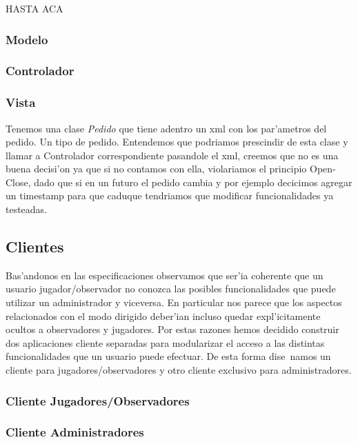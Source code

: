 \todo HASTA ACA

\subsubsection{Modelo}

\subsubsection{Controlador}

\subsubsection{Vista}

Tenemos una clase \textit{Pedido} que tiene adentro un xml con los par'ametros del pedido. Un tipo de pedido.
Entendemos que podriamos prescindir de esta clase y llamar a Controlador correspondiente pasandole el xml,
creemos que no es una buena decisi'on ya que si no contamos con ella, violariamos el principio Open-Close, dado 
que si en un futuro el pedido cambia y por ejemplo decicimos agregar un timestamp para que caduque tendriamos que 
modificar funcionalidades ya testeadas.

\subsection{Clientes}

Bas'andonos en las especificaciones observamos que ser'ia coherente que un usuario jugador/observador no conozca las posibles funcionalidades que puede utilizar un administrador y viceversa. En particular nos parece que los aspectos relacionados con el modo dirigido deber'ian incluso quedar expl'icitamente ocultos a observadores y jugadores. Por estas razones hemos decidido construir dos aplicaciones cliente separadas para modularizar el acceso a las distintas funcionalidades que un usuario puede efectuar. De esta forma dise~namos un cliente para jugadores/observadores y otro cliente exclusivo para administradores.

\subsubsection{\label{Clientes::Jugadores/Observadores}Cliente Jugadores/Observadores}

\subsubsection{\label{Clientes::Administradores}Cliente Administradores}

